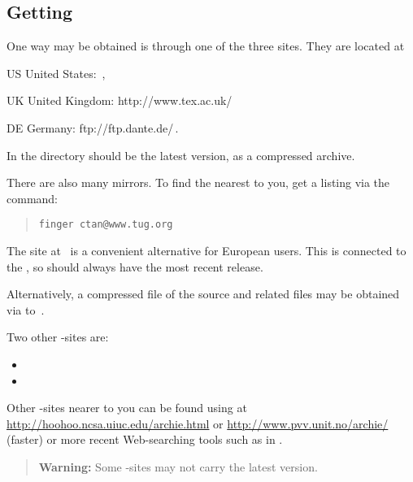 \subsection[center]{Getting \protect\latextohtml}
\tableofchildlinks*
\htmlrule
{}%
%
%
One way \latextohtml may be obtained is through one of the three
%
{\CTANtug{}} sites.
They are located at
\begin{htmllist}
\item [US ]
United States:
\htmladdnormallinkfoot{\CTANtug{}}{\CTANtug{\CTANA}}\,,
\item [UK ]
United Kingdom:
%
{http://www.tex.ac.uk/\CTANA}
\item [DE ]
Germany:
%
{ftp://ftp.dante.de/\CTANA}\,.
\end{htmllist}
In the directory \htmladdnormallink{\CTANA/}{\CTANtug{\CTANA}} 
should be the latest version, as a compressed archive.

\smallskip\noindent
There are also many mirrors.
To find the nearest to you, get a listing via the command:
\begin{quote}
\texttt{finger ctan@www.tug.org}
\end{quote}

\noindent
The site at \CVSsite\ is a convenient alternative for European users.
This is connected to the ,
so should always have the most recent release.

%
\smallskip\noindent
Alternatively, a compressed  file of the source and related files 
may be obtained via  to \sourceA\,.

\smallskip\noindent
Two other -sites are:
\begin{itemize}
\item \sourceB{}
\item \sourceC{}
\end{itemize}

%
%
\smallskip\noindent
Other -sites nearer to you can be found using  at 
\url{http://hoohoo.ncsa.uiuc.edu/archie.html} or 
\url{http://www.pvv.unit.no/archie/} (faster) 
or more recent Web-searching tools such as 
in .
\begin{quote}
\textbf{Warning: }%
Some -sites may not carry the latest version.
\end{quote}

